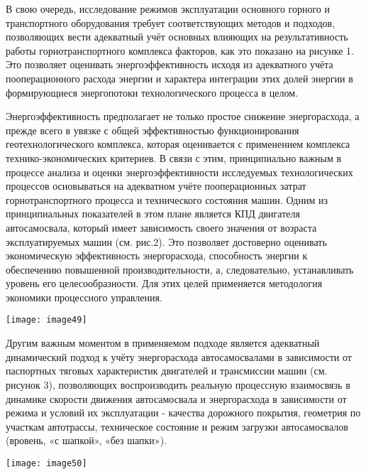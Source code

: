 \begin{multicols}{2}

В свою очередь, исследование режимов эксплуатации основного горного и
транспортного оборудования требует соответствующих методов и подходов,
позволяющих вести адекватный учёт основных влияющих на результативность
работы горнотранспортного комплекса факторов, как это показано на
рисунке 1. Это позволяет оценивать энергоэффективность исходя из
адекватного учёта пооперационного расхода энергии и характера интеграции
этих долей энергии в формирующиеся энергопотоки технологического
процесса в целом.

Энергоэффективность предполагает не только простое снижение
энергорасхода, а прежде всего в увязке с общей эффективностью
функционирования геотехнологического комплекса, которая оценивается с
применением комплекса технико-экономических критериев. В связи с этим,
принципиально важным в процессе анализа и оценки энергоэффективности
исследуемых технологических процессов основываться на адекватном учёте
пооперационных затрат горнотранспортного процесса и технического
состояния машин. Одним из принципиальных показателей в этом плане
является КПД двигателя автосамосвала, который имеет зависимость своего
значения от возраста эксплуатируемых машин (см. рис.2). Это позволяет
достоверно оценивать экономическую эффективность энергорасхода,
способность энергии к обеспечению повышенной производительности, а,
следовательно, устанавливать уровень его целесообразности. Для этих
целей применяется методология экономики процессного управления.

{\centering
    \texttt{[image: image49]}
    }

Другим важным моментом в применяемом подходе является адекватный
динамический подход к учёту энергорасхода автосамосвалами в зависимости
от паспортных тяговых характеристик двигателей и трансмиссии машин (см.
рисунок 3), позволяющих воспроизводить реальную процессную взаимосвязь в
динамике скорости движения автосамосвала и энергорасхода в зависимости
от режима и условий их эксплуатации - качества дорожного покрытия,
геометрия по участкам автотрассы, техническое состояние и режим загрузки
автосамосвалов (вровень, «с шапкой», «без шапки»).

\vspace{0.5em}

{\centering
    \texttt{[image: image50]}
    }


\end{multicols}
